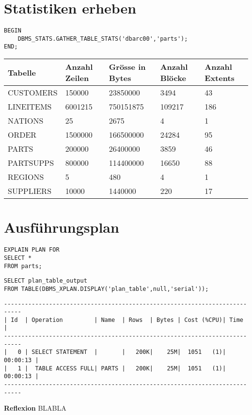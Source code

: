 \documentclass[10pt]{article}
\begin{document}
\section{Statistiken erheben}
\begin{lstlisting}[style=sql]
BEGIN
	DBMS_STATS.GATHER_TABLE_STATS('dbarc00','parts');
END;
\end{lstlisting}
{\normalsize
\begin{tabular}{|l|l|l|l|l|}
\hline
Tabelle & Anzahl Zeilen & Grösse in Bytes & Anzahl Blöcke & Anzahl Extents \\
\hline
\hline
CUSTOMERS & 150000 & 23850000 & 3494 & 43 \\
\hline
LINEITEMS & 6001215 & 750151875 & 109217 & 186 \\
\hline
NATIONS & 25 & 2675 & 4 & 1 \\
\hline
ORDER & 1500000 & 166500000 & 24284 &  95 \\
\hline
PARTS & 200000 & 26400000 & 3859 & 46 \\
\hline
PARTSUPPS & 800000 & 114400000 & 16650 & 88 \\
\hline
REGIONS & 5 & 480 & 4 & 1 \\
\hline
SUPPLIERS & 10000 & 1440000 & 220 & 17 \\
\hline
\end{tabular}
}


\section{Ausführungsplan}
\begin{lstlisting}[style=sql]
EXPLAIN PLAN FOR
SELECT *
FROM parts;
\end{lstlisting}
\begin{lstlisting}[style=sql]
SELECT plan_table_output
FROM TABLE(DBMS_XPLAN.DISPLAY('plan_table',null,'serial'));
\end{lstlisting}
\begin{lstlisting}[style=queryexecutionplan]
---------------------------------------------------------------------------
| Id  | Operation         | Name  | Rows  | Bytes | Cost (%CPU)| Time     |
---------------------------------------------------------------------------
|   0 | SELECT STATEMENT  |       |   200K|    25M|  1051   (1)| 00:00:13 |
|   1 |  TABLE ACCESS FULL| PARTS |   200K|    25M|  1051   (1)| 00:00:13 |
---------------------------------------------------------------------------
\end{lstlisting}
\textbf{Reflexion} \newline
BLABLA
\end{document}
